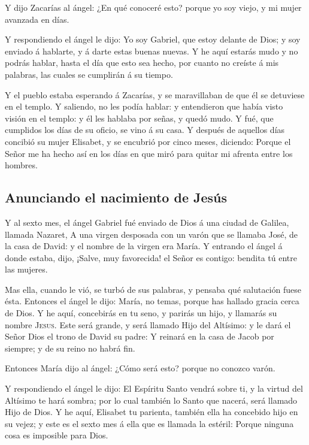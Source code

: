  Y dijo Zacarías al ángel: ¿En qué conoceré esto? porque
yo soy viejo, y mi mujer avanzada en días.

 Y respondiendo el ángel le dijo: Yo soy Gabriel, que
estoy delante de Dios; y soy enviado á hablarte, y á darte estas buenas
nuevas.  Y he aquí estarás mudo y no podrás hablar, hasta
el día que esto sea hecho, por cuanto no creíste á mis palabras, las
cuales se cumplirán á su tiempo.

 Y el pueblo estaba esperando á Zacarías, y se
maravillaban de que él se detuviese en el templo.  Y
saliendo, no les podía hablar: y entendieron que había visto visión en
el templo: y él les hablaba por señas, y quedó mudo.  Y
fué, que cumplidos los días de su oficio, se vino á su casa.
 Y después de aquellos días concibió su mujer Elisabet, y
se encubrió por cinco meses, diciendo:  Porque el Señor
me ha hecho así en los días en que miró para quitar mi afrenta entre los
hombres.

\hypertarget{anunciando-el-nacimiento-de-jesuxfas}{%
\subsection{Anunciando el nacimiento de
Jesús}\label{anunciando-el-nacimiento-de-jesuxfas}}

 Y al sexto mes, el ángel Gabriel fué enviado de Dios á
una ciudad de Galilea, llamada Nazaret,  A una virgen
desposada con un varón que se llamaba José, de la casa de David: y el
nombre de la virgen era María.  Y entrando el ángel á
donde estaba, dijo, ¡Salve, muy favorecida! el Señor es contigo: bendita
tú entre las mujeres.

 Mas ella, cuando le vió, se turbó de sus palabras, y
pensaba qué salutación fuese ésta.  Entonces el ángel le
dijo: María, no temas, porque has hallado gracia cerca de Dios.
 Y he aquí, concebirás en tu seno, y parirás un hijo, y
llamarás su nombre \textsc{Jesus}.  Este será grande, y
será llamado Hijo del Altísimo: y le dará el Señor Dios el trono de
David su padre:  Y reinará en la casa de Jacob por
siempre; y de su reino no habrá fin.

 Entonces María dijo al ángel: ¿Cómo será esto? porque no
conozco varón.

 Y respondiendo el ángel le dijo: El Espíritu Santo
vendrá sobre ti, y la virtud del Altísimo te hará sombra; por lo cual
también lo Santo que nacerá, será llamado Hijo de Dios. 
Y he aquí, Elisabet tu parienta, también ella ha concebido hijo en su
vejez; y este es el sexto mes á ella que es llamada la estéril:
 Porque ninguna cosa es imposible para Dios.

